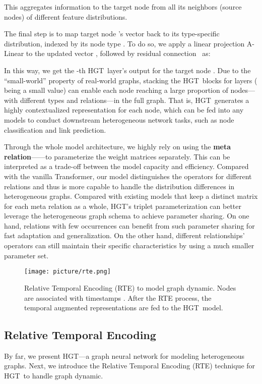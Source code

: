 \documentclass[sigconf]{acmart}
\theoremstyle{definition}
\newcommand{\short}{HGT}
\begin{document}
This aggregates information to the target node  from all its neighbors (source nodes) of different feature distributions. 

The final step is to map target node 's vector back to its type-specific distribution, indexed by its node type . 
To do so, we apply a linear projection A-Linear to the updated vector , followed by residual connection~\cite{DBLP:conf/cvpr/HeZRS16} as:

In this way, we get the -th \short\ layer's output  for the target node . 
Due to the ``small-world'' property of real-world graphs, stacking the \short\ blocks for  layers ( being a small value) can enable each node reaching  a large proportion of nodes---with different types and relations---in the full graph. 
That is, \short\ generates a highly contextualized representation  for each node, which can be fed into any models to conduct downstream heterogeneous network tasks, such as node classification and link prediction. 

Through the whole model architecture, we highly rely on using the \textbf{meta relation}------to parameterize the weight matrices separately. 
This can be interpreted as a trade-off between the model capacity and efficiency. Compared with the vanilla Transformer, our model distinguishes the operators for different relations and thus is more capable to handle the distribution differences in heterogeneous graphs. 
Compared with existing models that keep a distinct matrix for each meta relation as a whole, \short's triplet parameterization can better leverage the heterogeneous graph schema to achieve parameter sharing. 
On one hand, relations with few occurrences can benefit from such parameter sharing for fast adaptation and generalization. 
On the other hand, different relationships' operators can still maintain their specific characteristics by using a much smaller parameter set. 






\begin{figure}[t!]
    \centering
    \texttt{[image: picture/rte.png]}
    \caption{Relative Temporal Encoding (RTE) to model graph dynamic. \textmd{Nodes  are associated with timestamps . After the RTE process, the temporal augmented representations are fed to the \short\ model.}}
    \label{fig:rte}
\end{figure} 



\subsection{Relative Temporal Encoding}
By far, we present \short---a graph neural network for modeling heterogeneous graphs. 
Next, we introduce the Relative Temporal Encoding (RTE) technique for \short\ to handle graph dynamic. 
\end{document}
